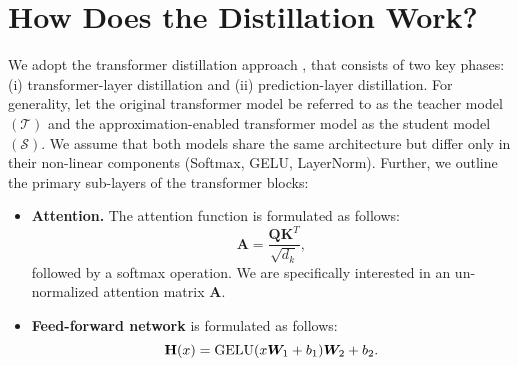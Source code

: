 \clearpage
\setcounter{page}{1}
\maketitlesupplementary


\appendix 

\section{How Does the Distillation Work?} 
\label{section: how-distillation}
We adopt the transformer distillation approach \cite{jiao2019tinybert}, that consists of two key phases: (i) transformer-layer distillation and (ii) prediction-layer distillation. For generality, let the original transformer model be referred to as the teacher model $(\mathcal{T})$ and the approximation-enabled transformer model as the student model $(\mathcal{S})$. We assume that both models share the same architecture but differ only in their non-linear components (Softmax, GELU, LayerNorm). Further, we outline the primary sub-layers of the transformer blocks: 
\begin{itemize}
    \item \textbf{Attention.} The attention function is formulated as follows: 
    \begin{equation}
        \mathbf{A} = \frac{\mathbf{Q}\mathbf{K}^T}{\sqrt{d_k}},  
        \label{eq: attention}
    \end{equation}
    followed by a softmax operation. We are specifically interested in an un-normalized attention matrix $\mathbf{A}$. 
    \item \textbf{Feed-forward network} is formulated as follows: 
    \begin{equation}
        \mathbf{H}(x) = \text{GELU}(x{\bm{W}}_1 + b_1){\bm{W}}_2 + b_2. 
        \label{eq: hidd-0}
    \end{equation}
\end{itemize}

